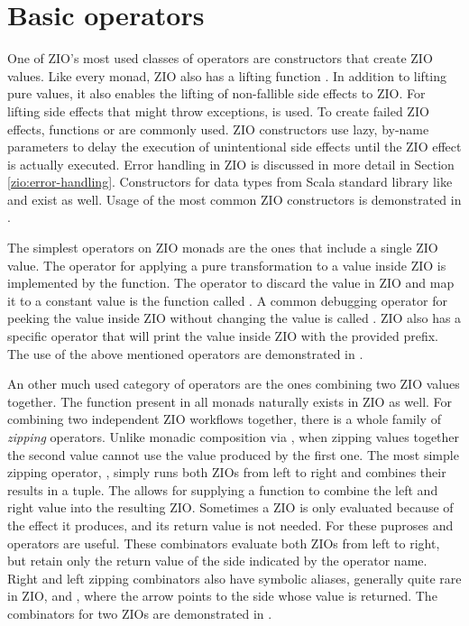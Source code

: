 \section{Basic operators}
One of ZIO's most used classes of operators are constructors that create ZIO values. Like every monad, ZIO also has a lifting function . In addition to lifting pure values, it also enables the lifting of non-fallible side effects to ZIO. For lifting side effects that might throw exceptions,  is used. To create failed ZIO effects, functions  or  are commonly used. ZIO constructors use lazy, by-name parameters to delay the execution of unintentional side effects until the ZIO effect is actually executed.  Error handling in ZIO is discussed in more detail in Section \ref{zio:error-handling}. Constructors for data types from Scala standard library like  and  exist as well. Usage of the most common ZIO constructors is demonstrated in .



The simplest operators on ZIO monads are the ones that include a single ZIO value. The operator for applying a pure transformation to a value inside ZIO is implemented by the  function. The operator to discard the value in ZIO and map it to a constant value is the function called . A common debugging operator for peeking the value inside ZIO without changing the value is called . ZIO also has a specific  operator that will print the value inside ZIO with the provided prefix. The use of the above mentioned operators are demonstrated in .



An other much used category of operators are the ones combining two ZIO values together. The  function present in all monads naturally exists in ZIO as well. For combining two independent ZIO workflows together, there is a whole family of \emph{zipping} operators. Unlike monadic composition via , when zipping values together the second value cannot use the value produced by the first one. The most simple zipping operator, , simply runs both ZIOs from left to right and combines their results in a tuple. The  allows for supplying a function to combine the left and right value into the resulting ZIO. Sometimes a ZIO is only evaluated because of the effect it produces, and its return value is not needed. For these puproses  and  operators are useful. These combinators evaluate both ZIOs from left to right, but retain only the return value of the side indicated by the operator name. Right and left zipping combinators also have symbolic aliases, generally quite rare in ZIO, \inlinecode{*>} and \inlinecode{<*}, where the arrow points to the side whose value is returned. The combinators for two ZIOs are demonstrated in .

